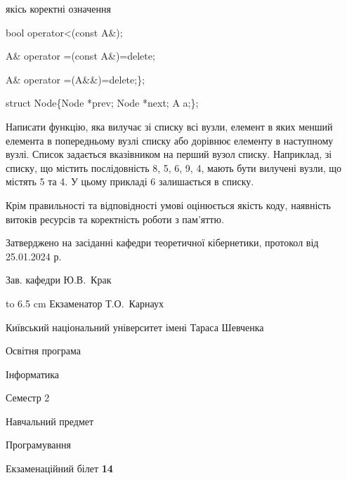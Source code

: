 \documentclass[12pt, ukrainian]{article}
\begin{document}
{\quad  якісь коректні означення 

\quad  bool operator<(const A\&); 

\quad A\& operator =(const A\&)=delete; 

\quad  A\& operator =(A\&\&)=delete;\};

struct Node\{Node *prev; Node *next; A a;\};

Написати функцію, яка вилучає зі списку всі вузли, елемент в яких менший елемента в попередньому вузлі списку або дорівнює елементу в наступному вузлі. Список задається вказівником на перший вузол списку. Наприклад, зі списку, що містить послідовність 8, 5, 6, 9, 4, мають бути вилучені вузли, що містять 5 та 4. У цьому прикладі 6 залишається в списку.

Крім правильності та відповідності умові оцінюється якість коду, наявність витоків ресурсів та коректність роботи з пам'яттю. 

}
{\smallskip\smallskip \begin {scriptsize} Затверджено на засіданні кафедри теоретичної кібернетики, протокол   від   25.01.2024 р.\par\smallskip\smallskip\smallskip\smallskip
{\parbox {6.5 cm} {Зав. кафедри \dotfill Ю.В.~Крак}}\hspace {0.7cm} {\hbox to 6.5 cm { Екзаменатор \dotfill Т.О.~Карнаух}} \end{scriptsize}}
\newpage
{{\begin {scriptsize}\par
{ \center  Київський національний університет імені Тараса Шевченка \par}
{\parbox {5 cm}{Освітня програма \hfill}{\parbox {7 cm}{Інформатика\hfill}}\parbox {6 cm}{\hfill Семестр 2}}\par
{\parbox {5 cm} {Навчальний предмет \hfill}\parbox {7 cm}{Програмування \hfill}\parbox {6cm}{\hfill}\par}\vspace{-15pt} \end{scriptsize}}{\center Екзаменаційний білет \No \textbf { 14 }\par}}
\end{document}
